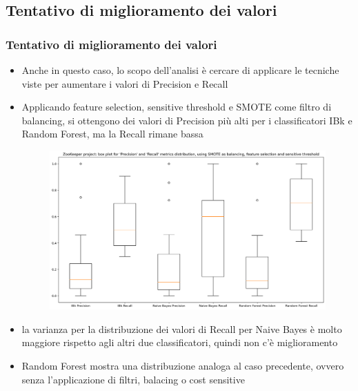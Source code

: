 \documentclass[10pt]{beamer}
\begin{document}
\begin{frame}
\subsection{Tentativo di miglioramento dei valori}
\frametitle{Tentativo di miglioramento dei valori}
\begin{itemize}
\item Anche in questo caso, lo scopo dell'analisi è cercare di applicare le tecniche viste per aumentare i valori di Precision e Recall
\item Applicando feature selection, sensitive threshold e SMOTE come filtro di balancing, si ottengono dei valori di Precision più alti per i classificatori IBk e Random Forest, ma la Recall rimane bassa
\begin{figure}
\includegraphics[scale=0.25]{images/pr_rc_bett_zk}
\end{figure}
\item la varianza per la distribuzione dei valori di Recall per Naive Bayes è molto maggiore rispetto agli altri due classificatori, quindi non c'è miglioramento 
\item Random Forest mostra una distribuzione analoga al caso precedente, ovvero senza l'applicazione di filtri, balacing o cost sensitive
\end{itemize}
\end{frame}
\end{document}
